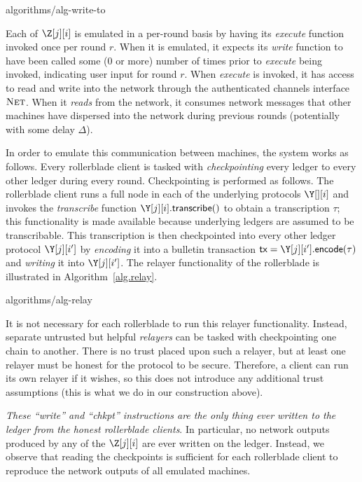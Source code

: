 {algorithms/alg-write-to}

Each of $\Z[j][i]$ is emulated in a per-round basis by having its \emph{execute}
function invoked once per round $r$. When it is emulated, it expects its \emph{write} function to have
been called some ($0$ or more) number of times prior to \emph{execute} being invoked,
indicating user input for round $r$. When \emph{execute} is invoked, it has access to read
and write into the network through the authenticated channels interface $\textsc{Net}$.
When it \emph{reads} from the network, it consumes network messages that other machines
have dispersed into the network during previous rounds (potentially with some delay $\Delta$).

In order to emulate this communication between machines, the system works as follows.
Every rollerblade client is tasked with \emph{checkpointing} every ledger to every other ledger
during every round. Checkpointing is performed as follows.
The rollerblade client runs a full node in each of the underlying protocols $\Y[][i]$ and
invokes the \emph{transcribe} function $\Y[j][i].\transcribe()$ to obtain a transcription
$\tau$; this functionality is made available because underlying ledgers are assumed to be
transcribable. This transcription is then checkpointed into every other ledger protocol
$\Y[j][i']$ by \emph{encoding} it into a bulletin transaction $\tx = \Y[j][i'].\encode(\tau)$
and \emph{writing} it into $\Y[j][i']$. The relayer functionality of the rollerblade
is illustrated in Algorithm~\ref{alg.relay}.

{algorithms/alg-relay}

It is not necessary for each rollerblade to run this relayer functionality. Instead,
separate untrusted but helpful \emph{relayers} can be tasked with checkpointing one
chain to another. There is no trust placed upon such a relayer, but at least one relayer
must be honest for the protocol to be secure. Therefore, a \rollerblade client can run its
own relayer if it wishes, so this does not introduce any additional trust assumptions
(this is what we do in our construction above).

\emph{These ``write'' and ``chkpt'' instructions are the only thing ever written
to the ledger from the honest rollerblade clients}. In particular, no network outputs
produced by any of the $\Z[j][i]$ are ever written on the ledger. Instead, we observe
that reading the checkpoints is sufficient for each rollerblade client to reproduce
the network outputs of all emulated machines.

